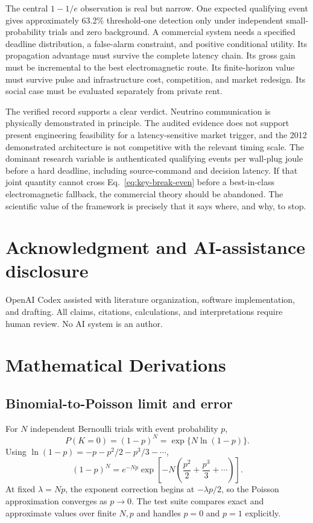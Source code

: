 \documentclass[11pt]{article}
\begin{document}
The central $1-1/e$ observation is real but narrow. One expected qualifying event gives approximately 63.2\% threshold-one detection only under independent small-probability trials and zero background. A commercial system needs a specified deadline distribution, a false-alarm constraint, and positive conditional utility. Its propagation advantage must survive the complete latency chain. Its gross gain must be incremental to the best electromagnetic route. Its finite-horizon value must survive pulse and infrastructure cost, competition, and market redesign. Its social case must be evaluated separately from private rent.

The verified record supports a clear verdict. Neutrino communication is physically demonstrated in principle. The audited evidence does not support present engineering feasibility for a latency-sensitive market trigger, and the 2012 demonstrated architecture is not competitive with the relevant timing scale. The dominant research variable is authenticated qualifying events per wall-plug joule before a hard deadline, including source-command and decision latency. If that joint quantity cannot cross Eq.~\eqref{eq:key-break-even} before a best-in-class electromagnetic fallback, the commercial theory should be abandoned. The scientific value of the framework is precisely that it says where, and why, to stop.

\section*{Acknowledgment and AI-assistance disclosure}

OpenAI Codex assisted with literature organization, software implementation, and drafting. All claims, citations, calculations, and interpretations require human review. No AI system is an author.

\appendix
\section{Mathematical Derivations}

\subsection{Binomial-to-Poisson limit and error}

For $N$ independent Bernoulli trials with event probability $p$,
\begin{equation}
P(K=0)=(1-p)^N=\exp\{N\ln(1-p)\}.
\end{equation}
Using $\ln(1-p)=-p-p^2/2-p^3/3-\cdots$,
\begin{equation}
(1-p)^N=e^{-Np}\exp\left[-N\left(\frac{p^2}{2}+\frac{p^3}{3}+\cdots\right)\right].
\end{equation}
At fixed $\lambda=Np$, the exponent correction begins at $-\lambda p/2$, so the Poisson approximation converges as $p\rightarrow0$. The test suite compares exact and approximate values over finite $N,p$ and handles $p=0$ and $p=1$ explicitly.
\end{document}
